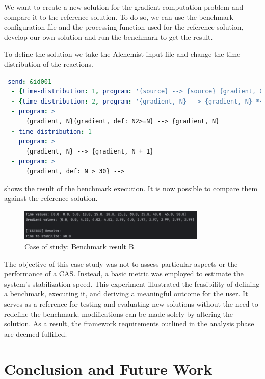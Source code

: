\documentclass[12pt,a4paper,openright,twoside]{book}
\begin{document}
We want to create a new solution for the gradient computation problem and compare it to the reference solution.
To do so, we can use the benchmark configuration file and the processing function used for the reference solution,
develop our own solution and run the benchmark to get the result.

To define the solution we take the Alchemist input file and change the time distribution of the reactions.

\begin{lstlisting}[language=yaml, caption={Case of study: gradient program B.}]
  _send: &id001
  - {time-distribution: 1, program: '{source} --> {source} {gradient, 0}'}
  - {time-distribution: 2, program: '{gradient, N} --> {gradient, N} *{gradient, N+#D}'}
  - program: >
      {gradient, N}{gradient, def: N2>=N} --> {gradient, N}
  - time-distribution: 1
    program: >
      {gradient, N} --> {gradient, N + 1}
  - program: >
      {gradient, def: N > 30} -->
\end{lstlisting}

 shows the result of the benchmark execution.
It is now possible to compare them against the reference solution.

\begin{figure}[H]
  \centering
  \includegraphics[width=0.8\textwidth]{figures/result-B.png}
  \caption{Case of study: Benchmark result B.}
  \label{fig:result-B}
\end{figure}

The objective of this case study was not to assess particular aspects or the performance of a CAS. 
Instead, a basic metric was employed to estimate the system's stabilization speed.
This experiment illustrated the feasibility of defining a benchmark, executing it, and deriving a meaningful outcome for the user. 
It serves as a reference for testing and evaluating new solutions without the need to redefine the benchmark; modifications can be made solely by altering the solution. 
As a result, the framework requirements outlined in the analysis phase are deemed fulfilled.

\chapter{Conclusion and Future Work}
\label{ch:conclusion}
\end{document}
